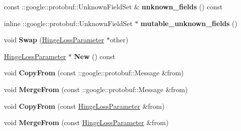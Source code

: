 \begin{DoxyCompactItemize}
\mbox{\label{classcaffe_1_1_hinge_loss_parameter_a90df3f2dc9f0053e1c17a988bd2492f4}} 
const \+::google\+::protobuf\+::\+Unknown\+Field\+Set \& {\bfseries unknown\+\_\+fields} () const
\item 
\mbox{\label{classcaffe_1_1_hinge_loss_parameter_a581eec65ef6f8161c1b3d59ced650eef}} 
inline \+::google\+::protobuf\+::\+Unknown\+Field\+Set $\ast$ {\bfseries mutable\+\_\+unknown\+\_\+fields} ()
\item 
\mbox{\label{classcaffe_1_1_hinge_loss_parameter_a71f1261f678ef55e9b0b30a9c1752f1c}} 
void {\bfseries Swap} (\mbox{\hyperlink{classcaffe_1_1_hinge_loss_parameter}{Hinge\+Loss\+Parameter}} $\ast$other)
\item 
\mbox{\label{classcaffe_1_1_hinge_loss_parameter_aebfe8ddc9145fd5ab335e5e4dbc46468}} 
\mbox{\hyperlink{classcaffe_1_1_hinge_loss_parameter}{Hinge\+Loss\+Parameter}} $\ast$ {\bfseries New} () const
\item 
\mbox{\label{classcaffe_1_1_hinge_loss_parameter_abbfe49de7f959650dcef0b5073f1e0d9}} 
void {\bfseries Copy\+From} (const \+::google\+::protobuf\+::\+Message \&from)
\item 
\mbox{\label{classcaffe_1_1_hinge_loss_parameter_aee9512102a2e27bc388b1d9d8ccf81af}} 
void {\bfseries Merge\+From} (const \+::google\+::protobuf\+::\+Message \&from)
\item 
\mbox{\label{classcaffe_1_1_hinge_loss_parameter_ab6dea5e139a3f60a923763e24863f841}} 
void {\bfseries Copy\+From} (const \mbox{\hyperlink{classcaffe_1_1_hinge_loss_parameter}{Hinge\+Loss\+Parameter}} \&from)
\item 
\mbox{\label{classcaffe_1_1_hinge_loss_parameter_a85a76548810d09a92c579a2cc1429e07}} 
void {\bfseries Merge\+From} (const \mbox{\hyperlink{classcaffe_1_1_hinge_loss_parameter}{Hinge\+Loss\+Parameter}} \&from)
\item 
\mbox{\label{classcaffe_1_1_hinge_loss_parameter_a1b38fa607530b05660b4f02e39d2943a}} 

\end{DoxyCompactItemize}
